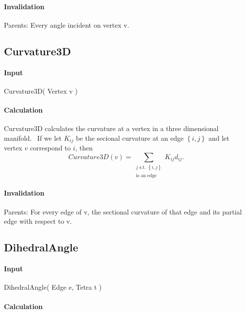 \paragraph{Invalidation}

\bigskip Parents: Every angle incident on vertex v.

\subsection{Curvature3D}

\paragraph{Input}

Curvature3D( Vertex v )

\paragraph{Calculation}

Curvature3D calculates the curvature at a vertex in a three dimensional
manifold. \ If we let $K_{ij}$ be the secional curvature at an edge $\left\{
i,j\right\} $ and let vertex $v$ correspond to $i$, then%
\begin{equation*}
Curvature3D\left( v\right) =\sum\limits_{\substack{ j\text{ s.t. }\left\{
i,j\right\}  \\ \text{is an edge}}}K_{ij}d_{ij}.
\end{equation*}

\paragraph{Invalidation}

Parents: For every edge of v, the sectional curvature of that edge and its
partial edge with respect to v.\bigskip

\subsection{DihedralAngle}

\paragraph{Input}

DihedralAngle( Edge e, Tetra t )

\paragraph{Calculation}

